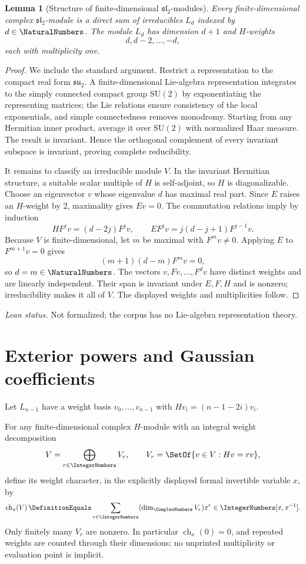 \documentclass[11pt,a4paper,oneside,openany]{book}
\newtheorem{lemma}[lemma]{Lemma}
\theoremstyle{definition}
\theoremstyle{remark}
\newcommand{\WeightCharacter}[2]{\operatorname{ch}_{#2}\!\left(#1\right)}
\begin{document}
\begin{lemma}[Structure of finite-dimensional $\mathfrak{sl}_2$-modules]\label{lem:sl2-structure}
Every finite-dimensional complex $\mathfrak{sl}_2$-module is a direct sum of irreducibles $L_d$ indexed by $d\in\NaturalNumbers$.  The module $L_d$ has dimension $d+1$ and $H$-weights
\[
 d,d-2,\dots,-d,
\]
each with multiplicity one.
\end{lemma}

\begin{proof}
We include the standard argument.  Restrict a representation to the compact real form $\mathfrak{su}_2$.  A finite-dimensional Lie-algebra representation integrates to the simply connected compact group $\mathrm{SU}(2)$ by exponentiating the representing matrices; the Lie relations ensure consistency of the local exponentials, and simple connectedness removes monodromy.  Starting from any Hermitian inner product, average it over $\mathrm{SU}(2)$ with normalized Haar measure.  The result is invariant.  Hence the orthogonal complement of every invariant subspace is invariant, proving complete reducibility.

It remains to classify an irreducible module $V$.  In the invariant Hermitian structure, a suitable scalar multiple of $H$ is self-adjoint, so $H$ is diagonalizable.  Choose an eigenvector $v$ whose eigenvalue $d$ has maximal real part.  Since $E$ raises an $H$-weight by $2$, maximality gives $Ev=0$.  The commutation relations imply by induction
\[
 H F^jv=(d-2j)F^jv,
 \qquad
 E F^jv=j(d-j+1)F^{j-1}v.
\]
Because $V$ is finite-dimensional, let $m$ be maximal with $F^mv\ne0$.  Applying $E$ to $F^{m+1}v=0$ gives
\[
 (m+1)(d-m)F^mv=0,
\]
so $d=m\in\NaturalNumbers$.  The vectors $v,Fv,\dots,F^dv$ have distinct weights and are linearly independent.  Their span is invariant under $E,F,H$ and is nonzero; irreducibility makes it all of $V$.  The displayed weights and multiplicities follow.
\end{proof}

\emph{Lean status.}  Not formalized; the corpus has no Lie-algebra representation
theory.


\section{Exterior powers and Gaussian coefficients}

Let $L_{n-1}$ have a weight basis $v_0,\dots,v_{n-1}$ with
\(
 Hv_i=(n-1-2i)v_i.
\)

For any finite-dimensional complex $H$-module with an integral weight
decomposition
\[
 V=\bigoplus_{r\in\IntegerNumbers}V_r,
 \qquad
 V_r=\SetOf{v\in V:Hv=rv},
\]
define its weight character, in the explicitly displayed formal invertible
variable $x$, by
\[
 \WeightCharacter{V}{x}
 \DefinitionEquals
 \sum_{r\in\IntegerNumbers}(\dim_{\ComplexNumbers}V_r)x^r
 \in\IntegerNumbers[x,x^{-1}].
\]
Only finitely many $V_r$ are nonzero.  In particular
$\WeightCharacter{0}{x}=0$, and repeated weights are counted through their
dimensions; no unprinted multiplicity or evaluation point is implicit.
\end{document}
